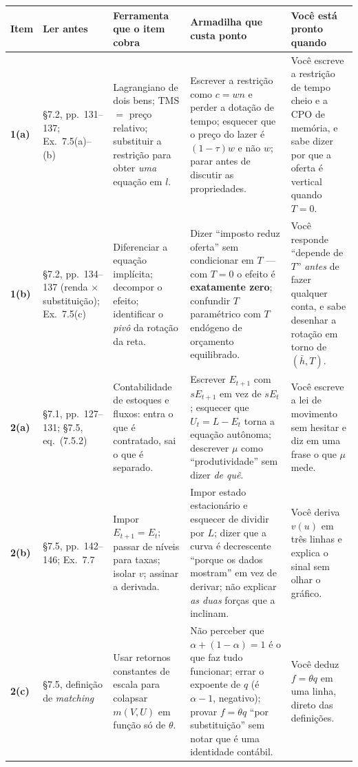 \documentclass[11pt, a4paper]{article}
\begin{document}
\begin{center}
\footnotesize
\renewcommand{\arraystretch}{1.25}
\begin{tabular}{@{}p{0.8cm}p{2.35cm}p{3.85cm}p{3.95cm}p{3.35cm}@{}}
\toprule
\textbf{Item} & \textbf{Ler antes} & \textbf{Ferramenta que o item cobra} &
\textbf{Armadilha que custa ponto} & \textbf{Você está pronto quando} \\
\midrule

\textbf{1(a)} & §7.2, pp.\ 131--137; Ex.\ 7.5(a)--(b)
& Lagrangiano de dois bens; TMS $=$ preço relativo; substituir a restrição para obter
  \emph{uma} equação em $l$.
& Escrever a restrição como $c = wn$ e perder a dotação de tempo; esquecer que o preço do
  lazer é $(1-\tau)w$ e não $w$; parar antes de discutir as propriedades.
& Você escreve a restrição de tempo cheio e a CPO de memória, e sabe dizer por que a
  oferta é vertical quando $T=0$. \\

\textbf{1(b)} & §7.2, pp.\ 134--137 (renda $\times$ substituição); Ex.\ 7.5(c)
& Diferenciar a equação implícita; decompor o efeito; identificar o \emph{pivô} da
  rotação da reta.
& Dizer ``imposto reduz oferta'' sem condicionar em $T$ --- com $T=0$ o efeito é
  \textbf{exatamente zero}; confundir $T$ paramétrico com $T$ endógeno de orçamento
  equilibrado.
& Você responde ``depende de $T$'' \emph{antes} de fazer qualquer conta, e sabe desenhar
  a rotação em torno de $(\bar h,T)$. \\

\textbf{2(a)} & §7.1, pp.\ 127--131; §7.5, eq.\ (7.5.2)
& Contabilidade de estoques e fluxos: entra o que é contratado, sai o que é separado.
& Escrever $E_{t+1}$ com $sE_{t+1}$ em vez de $sE_t$; esquecer que $U_t = L-E_t$ torna a
  equação autônoma; descrever $\mu$ como ``produtividade'' sem dizer \emph{de quê}.
& Você escreve a lei de movimento sem hesitar e diz em uma frase o que $\mu$ mede. \\

\textbf{2(b)} & §7.5, pp.\ 142--146; Ex.\ 7.7
& Impor $E_{t+1}=E_t$; passar de níveis para taxas; isolar $v$; assinar a derivada.
& Impor estado estacionário e esquecer de dividir por $L$; dizer que a curva é
  decrescente ``porque os dados mostram'' em vez de derivar; não explicar \emph{as duas}
  forças que a inclinam.
& Você deriva $v(u)$ em três linhas e explica o sinal sem olhar o gráfico. \\

\textbf{2(c)} & §7.5, definição de \emph{matching}
& Usar retornos constantes de escala para colapsar $m(V,U)$ em função só de $\theta$.
& Não perceber que $\alpha+(1-\alpha)=1$ é o que faz tudo funcionar; errar o expoente de
  $q$ (é $\alpha-1$, negativo); provar $f=\theta q$ ``por substituição'' sem notar que é
  uma identidade contábil.
& Você deduz $f=\theta q$ em uma linha, direto das definições. \\


\end{tabular}
\end{center}
\end{document}
